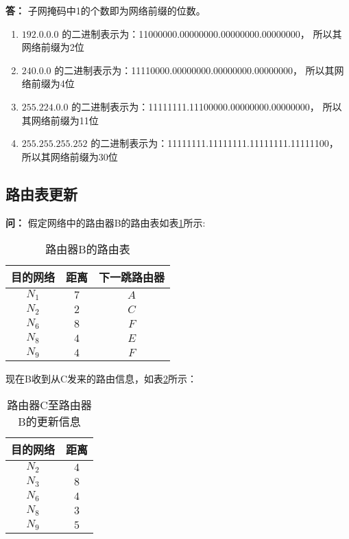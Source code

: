 \documentclass[12pt,hyperref,a4paper,UTF8]{ctexart}
\begin{document}
\textbf{答：}
子网掩码中1的个数即为网络前缀的位数。
\begin{enumerate}
    \item $192.0.0.0$ 的二进制表示为：11000000.00000000.00000000.00000000， 所以其网络前缀为2位
    \item $240.0.0$ 的二进制表示为：11110000.00000000.00000000.00000000， 所以其网络前缀为4位
    \item $255.224.0.0$ 的二进制表示为：11111111.11100000.00000000.00000000， 所以其网络前缀为11位
    \item $255.255.255.252$ 的二进制表示为：11111111.11111111.11111111.11111100， 所以其网络前缀为30位
\end{enumerate}

\subsection{路由表更新}
\textbf{问：}
假定网络中的路由器B的路由表如表\ref{tab:router_b}所示:
\begin{table}[h!]
    \centering
    \caption{路由器B的路由表}
    \begin{tabular}{c|c|c}
    \toprule
    目的网络 & 距离 & 下一跳路由器\\
    \midrule
    $N_1$ & $7$ & $A$\\
    $N_2$ & $2$ & $C$\\
    $N_6$ & $8$ & $F$\\
    $N_8$ & $4$ & $E$\\
    $N_9$ & $4$ & $F$\\
    \bottomrule
    \end{tabular}
    \label{tab:router_b}
\end{table}

现在B收到从C发来的路由信息，如表\ref{tab:updates}所示：
\begin{table}[h!]
    \centering
    \caption{路由器C至路由器B的更新信息}
    \begin{tabular}{c|c}
    \toprule
    目的网络 & 距离\\
    \midrule
    $N_2$ & $4$\\
    $N_3$ & $8$\\
    $N_6$ & $4$\\
    $N_8$ & $3$\\
    $N_9$ & $5$\\
    \bottomrule
    \end{tabular}
    \label{tab:updates}
\end{table}
\end{document}
